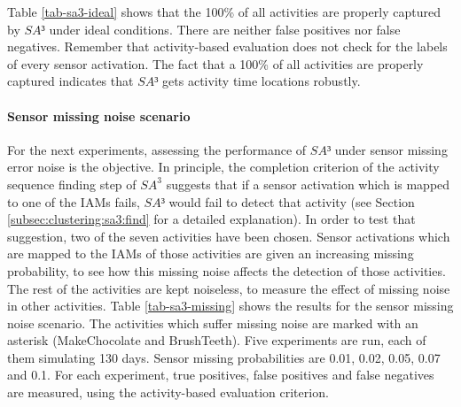 Table \ref{tab-sa3-ideal} shows that the 100\% of all activities are properly captured by $SA³$ under ideal conditions. There are neither false positives nor false negatives. Remember that activity-based evaluation does not check for the labels of every sensor activation. The fact that a 100\% of all activities are properly captured indicates that $SA³$ gets activity time locations robustly.

\paragraph*{Sensor missing noise scenario}

For the next experiments, assessing the performance of $SA³$ under sensor missing error noise is the objective. In principle, the completion criterion of the activity sequence finding step of $SA^3$ suggests that if a sensor activation which is mapped to one of the IAMs fails, $SA³$ would fail to detect that activity (see Section \ref{subsec:clustering:sa3:find} for a detailed explanation). In order to test that suggestion, two of the seven activities have been chosen. Sensor activations which are mapped to the IAMs of those activities are given an increasing missing probability, to see how this missing noise affects the detection of those activities. The rest of the activities are kept noiseless, to measure the effect of missing noise in other activities. Table \ref{tab-sa3-missing} shows the results for the sensor missing noise scenario. The activities which suffer missing noise are marked with an asterisk (MakeChocolate and BrushTeeth). Five experiments are run, each of them simulating 130 days. Sensor missing probabilities are 0.01, 0.02, 0.05, 0.07 and 0.1. For each experiment, true positives, false positives and false negatives are measured, using the activity-based evaluation criterion. 

